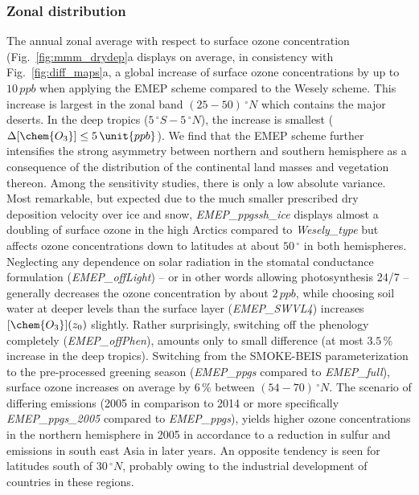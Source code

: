 \documentclass[gmd, manuscript]{copernicus}
\begin{document}
\subsubsection{Zonal distribution}
\label{subsubsec:zonal}
%
The annual zonal average with respect to surface ozone concentration (Fig.~\ref{fig:mmm_drydep}a displays on average, in consistency with Fig.~\ref{fig:diff_maps}a, a global increase of surface ozone concentrations by up to $10\,\unit{ppb}$ when applying the EMEP scheme compared to the Wesely scheme. This increase is largest in the zonal band $(25-50)\,\unit{^\circ N}$ which contains the major deserts. In the deep tropics ($5\,\unit{^\circ S}-5\,\unit{^\circ N}$), the increase is smallest ($\Delta[\chem{O_3}]\leq 5\,\unit{ppb}$). We find that the EMEP scheme further intensifies the strong asymmetry between northern and southern hemisphere as a consequence of the distribution of the continental land masses and vegetation thereon. Among the sensitivity studies, there is only a low absolute variance. Most remarkable, but expected due to the much smaller prescribed dry deposition velocity over ice and snow, \emph{EMEP\_ppgssh\_ice} displays almost a doubling of surface ozone in the high Arctics compared to \emph{Wesely\_type} but affects ozone concentrations down to latitudes at about $50\,\unit{^\circ}$ in both hemispheres. Neglecting any dependence on solar radiation in the stomatal conductance formulation (\emph{EMEP\_offLight}) -- or in other words allowing photosynthesis 24/7 -- generally decreases the ozone concentration by about $2\,\unit{ppb}$, while choosing soil water at deeper levels than the surface layer (\emph{EMEP\_SWVL4}) increases $[\chem{O_3}](z_0)$ slightly. Rather surprisingly, switching off the phenology completely (\emph{EMEP\_offPhen}), amounts only to small difference (at most $3.5\,\unit{\%}$ increase in the deep tropics). Switching from the SMOKE-BEIS parameterization to the pre-processed greening season (\emph{EMEP\_ppgs} compared to \emph{EMEP\_full}), surface ozone increases on average by $6\,\unit{\%}$ between $(54-70)\,\unit{^\circ N}$. The scenario of differing emissions (2005 in comparison to 2014 or more specifically \emph{EMEP\_ppgs\_2005} compared to \emph{EMEP\_ppgs}), yields higher ozone concentrations in the northern hemisphere in 2005 in accordance to a reduction in sulfur and  emissions in south east Asia in later years. An opposite tendency is seen for latitudes south of $30\,\unit{^\circ N}$, probably owing to the industrial development of countries in these regions. 
\end{document}
